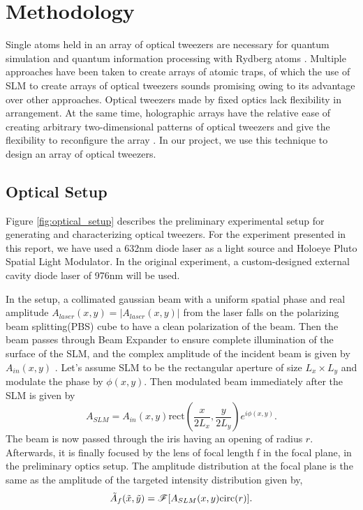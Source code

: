\section{Methodology}
Single atoms held in an array of optical tweezers are necessary for quantum simulation and quantum information processing with Rydberg atoms \cite{saffman2016quantum}. Multiple approaches have been taken to create arrays of atomic traps, of which the use of SLM to create arrays of optical tweezers sounds promising owing to its advantage over other approaches. Optical tweezers made by fixed optics lack flexibility in arrangement. At the same time, holographic arrays have the relative ease of creating arbitrary two-dimensional patterns of optical tweezers and give the flexibility to reconfigure the array \cite{samoylenko2020single}. In our project, we use this technique to design an array of optical tweezers.

\subsection{Optical Setup}
\label{sec2:Optical Setup}
Figure \ref{fig:optical_setup} describes the preliminary experimental setup for generating and characterizing optical tweezers. For the experiment presented in this report, we have used a 632nm diode laser as a light source and Holoeye Pluto Spatial Light Modulator. In the original experiment, a custom-designed external cavity diode laser of 976nm will be used.

In the setup, a collimated gaussian beam with a uniform spatial phase and real amplitude $A_{laser}(x,y) = |A_{laser}(x,y)|$ from the laser falls on the polarizing beam splitting(PBS) cube to have a clean polarization of the beam. Then the beam passes through Beam Expander to ensure complete illumination of the surface of the SLM, and the complex amplitude of the incident beam is given by $A_{in}(x,y)$ \cite{phdthesis1}. Let's assume SLM to be the rectangular aperture of size $L_x \times L_y$ and modulate the phase by $\phi(x,y)$. Then modulated beam immediately after the SLM is given by
\begin{equation}
    A_{SLM} = A_{in}(x,y)\text{rect}(\frac{x}{2L_x},\frac{y}{2L_y})e^{i\phi(x,y)}.
    \label{eq:1}
\end{equation}
The beam is now passed through the iris having an opening of radius $r$. Afterwards, it is finally focused by the lens of focal length f in the focal plane, in the preliminary optics setup. The amplitude distribution at the focal plane is the same as the amplitude of the targeted intensity distribution given by,
\begin{equation}
    \Tilde{A}_f(\Tilde{x},\Tilde{y}) = \mathscr{F}[A_{SLM}(x,y)\text{circ}(r)].
    \label{eq:2}
\end{equation}

